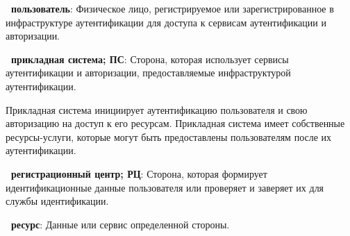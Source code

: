%





{\bf \thedefctr~пользователь}:
Физическое лицо, регистрируемое или зарегистрированное в инфраструктуре 
аутентификации для доступа к сервисам аутентификации и авторизации.
                

{\bf \thedefctr~прикладная система; ПС}:
Сторона, которая использует сервисы аутентификации и авторизации,
предоставляемые инфраструктурой аутентификации.

\begin{note*}
Прикладная система инициирует аутентификацию пользователя 
и свою авторизацию на доступ к его ресурсам.
%
Прикладная система имеет собственные ресурсы-услуги, 
которые могут быть предоставлены пользователям после их аутентификации.
\end{note*}

{\bf \thedefctr~регистрационный центр; РЦ}:
Сторона, которая формирует идентификационные данные пользователя
или проверяет и заверяет их для службы идентификации. 


{\bf \thedefctr~ресурс}:
Данные или сервис определенной стороны. 

